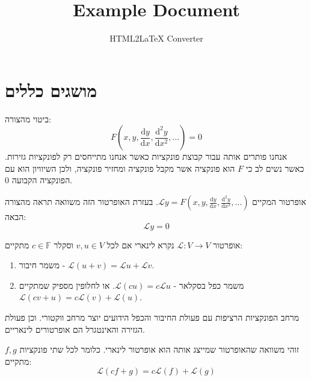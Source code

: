 \documentclass{tstextbook}
\begin{document}
\title{Example Document}
\author{HTML2LaTeX Converter}
\maketitle


\section{מושגים כללים}

\begin{definition}
ביטוי מהצורה:
$$F\left( x,y,\frac{\mathrm{d} y}{\mathrm{d} x} ,\frac{\mathrm{d} ^2y}{\mathrm{d} x^{2}},\dots  \right)=0$$
אנחנו פותרים אותה עבור קבוצת פונקציות כאשר אנחנו מתייחסים רק לפונקציות גזירות. כאשר נשים לב כי \(F\) הוא פונקציה אשר מקבל פונקציה ומחזיר פונקציה, ולכן השיוויון הוא עם הפונקציה הקבועה 0.

\end{definition}
\begin{definition}
אופרטור המקיים \(\mathcal{L}y=F\left( x,y,\frac{\mathrm{d} y}{\mathrm{d} x} ,\frac{\mathrm{d} ^2y}{\mathrm{d} x^{2}},\dots  \right)\). בעזרת האופרטור הזה משוואה תראה מהצורה הבאה:
$$\mathcal{L}y=0$$

\end{definition}
\begin{reminder}
אופרטור \(\mathcal{L}:V\to V\) נקרא לינארי אם לכל \(v,u \in V\) וסקלר \(c \in \mathbb{F}\) מתקיים:

  \begin{enumerate}
    \item משמר חיבור - \(\mathcal{L}(u+v)=\mathcal{L}u+\mathcal{L}v\). 


    \item משמר כפל בסקלאר - \(\mathcal{L}(cu)=c\mathcal{L}u\). 
או לחלופין מספיק שמתקיים \(\mathcal{L}(cv+u)=c\mathcal{L}(v)+\mathcal{L}(u)\).


  \end{enumerate}
\end{reminder}
\begin{reminder}
מרחב הפונקציות הרציפות עם פעולת החיבור והכפל הידועים יוצר מרחב ווקטורי. וכן פעולת הגזירה והאינטגרל הם אופרטורים לינאריים.

\end{reminder}
\begin{definition}
זוהי משוואה שהאופרטור שמייצג אותה הוא אופרטור לינארי. כלומר לכל שתי פונקציות \(f,g\) מתקיים:
$$\mathcal{L}(cf+g)=c\mathcal{L}(f)+\mathcal{L}(g)$$

\end{definition}
\end{document}

